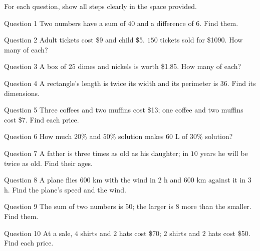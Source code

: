 \documentclass[11pt]{article}
\begin{document}
\clearpage
{}
For each question, show all steps clearly in the space provided.

\begin{qbox}{Question 1}
Two numbers have a sum of $40$ and a difference of $6$. Find them.\workspace{2.6cm}
\end{qbox}

\begin{qbox}{Question 2}
Adult tickets cost \$9 and child \$5. $150$ tickets sold for \$1090. How many of each?\workspace{2.8cm}
\end{qbox}

\begin{qbox}{Question 3}
A box of $25$ dimes and nickels is worth \$1.85. How many of each?\workspace{2.8cm}
\end{qbox}

\begin{qbox}{Question 4}
A rectangle's length is twice its width and its perimeter is $36$. Find its dimensions.\workspace{2.6cm}
\end{qbox}

\begin{qbox}{Question 5}
Three coffees and two muffins cost \$13; one coffee and two muffins cost \$7. Find each price.\workspace{2.8cm}
\end{qbox}

\begin{qbox}{Question 6}
How much $20\%$ and $50\%$ solution makes $60$ L of $30\%$ solution?\workspace{3.0cm}
\end{qbox}

\begin{qbox}{Question 7}
A father is three times as old as his daughter; in $10$ years he will be twice as old. Find their ages.\workspace{2.8cm}
\end{qbox}

\begin{qbox}{Question 8}
A plane flies $600$ km with the wind in $2$ h and $600$ km against it in $3$ h. Find the plane's speed and the wind.\workspace{3.0cm}
\end{qbox}

\begin{qbox}{Question 9}
The sum of two numbers is $50$; the larger is $8$ more than the smaller. Find them.\workspace{2.4cm}
\end{qbox}

\begin{qbox}{Question 10}
At a sale, $4$ shirts and $2$ hats cost \$70; $2$ shirts and $2$ hats cost \$50. Find each price.\workspace{2.8cm}
\end{qbox}
\end{document}
